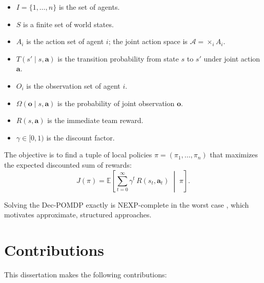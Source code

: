 \documentclass[12pt,oneside]{report}
\theoremstyle{definition}
\theoremstyle{remark}
\begin{document}
\vspace{6pt}
\begin{tcolorbox}[
  colback=jhulight,
  colframe=jhublue,
  arc=4pt,
  boxrule=0.8pt,
  left=16pt,
  right=16pt,
  top=10pt,
  bottom=10pt
]
\vspace{-4pt}
\begin{itemize}[leftmargin=*,itemsep=3pt,topsep=0pt]
  \item $I = \{1, \ldots, n\}$ is the set of agents.
  \item $S$ is a finite set of world states.
  \item $A_i$ is the action set of agent $i$; the joint action space is $\mathcal{A} = \times_i A_i$.
  \item $T(s' \mid s, \mathbf{a})$ is the transition probability from state $s$ to $s'$ under joint action $\mathbf{a}$.
  \item $O_i$ is the observation set of agent $i$.
  \item $\Omega(\mathbf{o} \mid s, \mathbf{a})$ is the probability of joint observation $\mathbf{o}$.
  \item $R(s, \mathbf{a})$ is the immediate team reward.
  \item $\gamma \in [0, 1)$ is the discount factor.
\end{itemize}
\vspace{-4pt}
\end{tcolorbox}
\vspace{6pt}

The objective is to find a tuple of local policies $\pi = (\pi_1, \ldots, \pi_n)$
that maximizes the expected discounted sum of rewards:
\begin{equation}
  J(\pi) = \mathbb{E}\left[ \sum_{t=0}^{\infty} \gamma^t \, R(s_t, \mathbf{a}_t) \;\middle|\; \pi \right].
  \label{eq:objective}
\end{equation}

Solving the Dec-POMDP exactly is NEXP-complete in the worst case
\citep{bernstein2002complexity}, which motivates approximate, structured approaches.

\section{Contributions}

This dissertation makes the following contributions:
\end{document}
